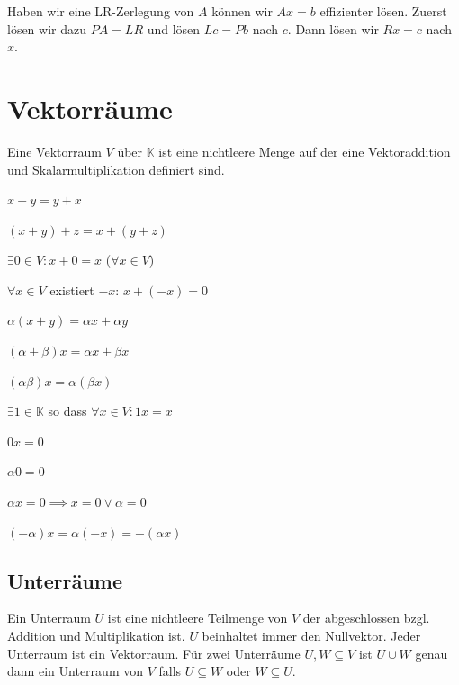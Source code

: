 \documentclass[a4paper,10pt]{article}
\def\K{\mathbb{K}}
\begin{document}
Haben wir eine LR-Zerlegung von $A$ können wir $Ax = b$ effizienter lösen. Zuerst lösen wir dazu $PA = LR$ und lösen $Lc = Pb$ nach $c$. Dann lösen wir $Rx = c$ nach $x$.

\section{Vektorräume}

\begin{mainbox}{}
  Eine Vektorraum $V$ über $\K$ ist eine nichtleere Menge auf der eine Vektoraddition und Skalarmultiplikation definiert sind.
  \begin{vaxioms}
    \item $x + y = y + x$
    \item $(x + y) + z = x + (y + z)$
    \item $\exists 0 \in V: x + 0 = x$ ($\forall x \in V$)
    \item $\forall x \in V$ existiert $-x$: $x + (-x) = 0$
    \item $\alpha(x + y) = \alpha x + \alpha y$
    \item $(\alpha + \beta)x = \alpha x + \beta x$
    \item $(\alpha \beta)x = \alpha (\beta x)$
    \item $\exists 1 \in \K$ so dass $\forall x \in V: 1x = x$
  \end{vaxioms}
\end{mainbox}

\begin{rowlist}
  \item $0x = 0$
  \item $\alpha 0 = 0$
  \item $\alpha x = 0 \implies x = 0 \vee \alpha = 0$
  \item $(-\alpha)x = \alpha (-x) = -(\alpha x)$
\end{rowlist}

\subsection{Unterräume}

Ein Unterraum $U$ ist eine nichtleere Teilmenge von $V$ der abgeschlossen bzgl. Addition und Multiplikation ist. $U$ beinhaltet immer den Nullvektor. Jeder Unterraum ist ein Vektorraum. Für zwei Unterräume $U, W \subseteq V$ ist $U \cup W$ genau dann ein Unterraum von $V$ falls $U \subseteq W$ oder $W \subseteq U$.\\
\end{document}
